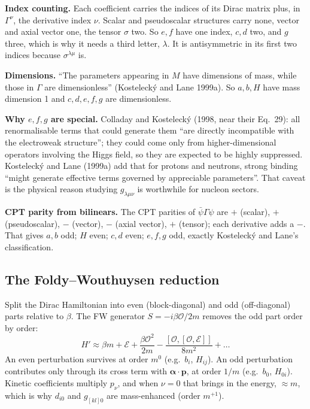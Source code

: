\documentclass[11pt,a4paper]{article}
\begin{document}
\textbf{Index counting.} Each coefficient carries the indices of its
Dirac matrix plus, in $\Gamma^\nu$, the derivative index $\nu$. Scalar
and pseudoscalar structures carry none, vector and axial vector one,
the tensor $\sigma$ two. So $e,f$ have one index, $c,d$ two, and $g$
three, which is why it needs a third letter, $\lambda$. It is
antisymmetric in its first two indices because $\sigma^{\lambda\mu}$ is.

\textbf{Dimensions.} ``The parameters appearing in $M$ have dimensions of
mass, while those in $\Gamma$ are dimensionless'' (Kostelecký and Lane
1999a). So $a,b,H$ have mass dimension 1 and $c,d,e,f,g$ are
dimensionless.

\textbf{Why $e,f,g$ are special.} Colladay and Kostelecký (1998, near
their Eq.~29): all renormalisable terms that could generate them ``are
directly incompatible with the electroweak structure''; they could come
only from higher-dimensional operators involving the Higgs field, so they
are expected to be highly suppressed. Kostelecký and Lane (1999a) add
that for protons and neutrons, strong binding ``might generate effective
terms governed by appreciable parameters''. That caveat is the physical
reason studying $g_{\lambda\mu\nu}$ is worthwhile for nucleon sectors.

\textbf{CPT parity from bilinears.} The CPT parities of
$\bar\psi\Gamma\psi$ are $+$ (scalar), $+$ (pseudoscalar), $-$ (vector),
$-$ (axial vector), $+$ (tensor); each derivative adds a $-$. That gives
$a,b$ odd; $H$ even; $c,d$ even; $e,f,g$ odd, exactly Kostelecký and
Lane's classification.

\subsection{The Foldy--Wouthuysen reduction}

Split the Dirac Hamiltonian into even (block-diagonal) and odd
(off-diagonal) parts relative to $\beta$. The FW generator
$S=-i\beta\mathcal O/2m$ removes the odd part order by order:
\begin{equation}
H'\approx\beta m+\mathcal E+\frac{\beta\mathcal O^2}{2m}
-\frac{[\mathcal O,[\mathcal O,\mathcal E]]}{8m^2}+\dots
\end{equation}
An even perturbation survives at order $m^0$ (e.g.\ $b_i$, $H_{ij}$). An
odd perturbation contributes only through its cross term with
$\bm\alpha\cdot\mathbf p$, at order $1/m$ (e.g.\ $b_0$, $H_{0i}$). Kinetic
coefficients multiply $p_\nu$, and when $\nu=0$ that brings in the
energy, $\approx m$, which is why $d_{i0}$ and $g_{[kl]0}$ are
mass-enhanced (order $m^{+1}$).
\end{document}
